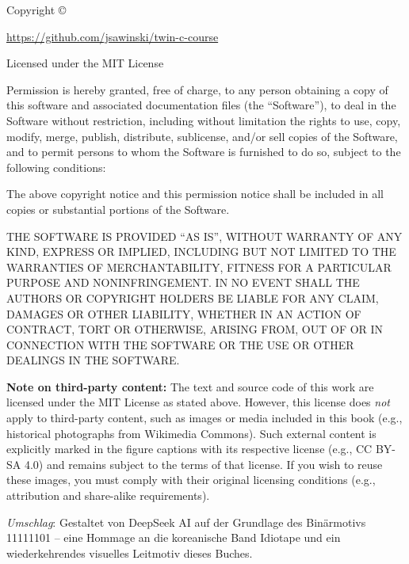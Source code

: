 \begin{fullwidth}
Copyright \copyright\ \the\year\ \thanklessauthor

\par{}

\par\url{https://github.com/jsawinski/twin-c-course}

\par Licensed under the MIT License

\noindent
Permission is hereby granted, free of charge, to any person obtaining a copy
of this software and associated documentation files (the ``Software''), to deal
in the Software without restriction, including without limitation the rights
to use, copy, modify, merge, publish, distribute, sublicense, and/or sell
copies of the Software, and to permit persons to whom the Software is
furnished to do so, subject to the following conditions:

\noindent
The above copyright notice and this permission notice shall be included in all
copies or substantial portions of the Software.

\noindent
THE SOFTWARE IS PROVIDED ``AS IS'', WITHOUT WARRANTY OF ANY KIND, EXPRESS OR
IMPLIED, INCLUDING BUT NOT LIMITED TO THE WARRANTIES OF MERCHANTABILITY,
FITNESS FOR A PARTICULAR PURPOSE AND NONINFRINGEMENT. IN NO EVENT SHALL THE
AUTHORS OR COPYRIGHT HOLDERS BE LIABLE FOR ANY CLAIM, DAMAGES OR OTHER
LIABILITY, WHETHER IN AN ACTION OF CONTRACT, TORT OR OTHERWISE, ARISING FROM,
OUT OF OR IN CONNECTION WITH THE SOFTWARE OR THE USE OR OTHER DEALINGS IN THE
SOFTWARE.

\vspace{1em}
\noindent
\textbf{Note on third-party content:}
The text and source code of this work are licensed under the MIT License as stated 
above. However, this license does \emph{not} apply to third-party content, such as 
images or media included in this book (e.g., historical photographs from Wikimedia 
Commons). Such external content is explicitly marked in the figure captions with 
its respective license (e.g., CC BY-SA 4.0) and remains subject to the terms of 
that license. If you wish to reuse these images, you must comply with their original 
licensing conditions (e.g., attribution and share-alike requirements).

\noindent
\textit{Umschlag}: Gestaltet von DeepSeek AI auf der Grundlage des Binärmotivs 11111101 –
eine Hommage an die koreanische Band Idiotape und ein wiederkehrendes visuelles Leitmotiv dieses Buches.
\end{fullwidth}

